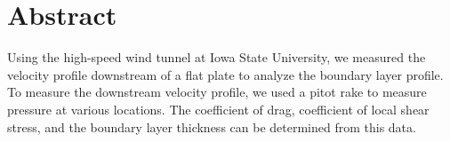\thispagestyle{plain} %



\chapter*{Abstract} %
Using the high-speed wind tunnel at Iowa State University, we measured the velocity profile downstream of a flat plate to analyze the boundary layer profile. To measure the downstream velocity profile, we used a pitot rake to measure pressure at various locations. The coefficient of drag, coefficient of local shear stress, and the boundary layer thickness can be determined from this data.



